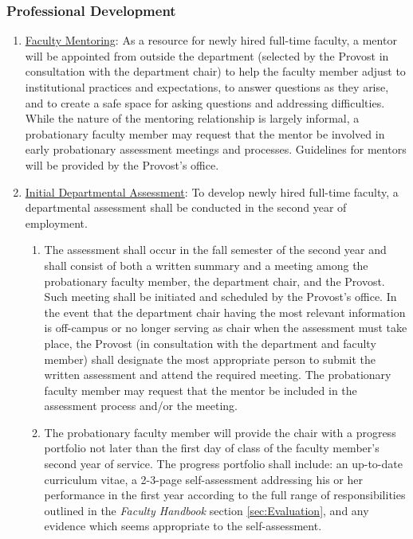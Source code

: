 		\subsubsection{Professional Development}
			\label{sec:ProfessionalDevelopment}
			\begin{enumerate}[label=\alph*)]

				\item{\underline{ Faculty Mentoring}:  As a resource for
					newly hired full-time faculty, a mentor will be
					appointed from outside the department (selected by the
					Provost in consultation with the department chair) to
					help the faculty member adjust to institutional
					practices and expectations, to answer questions as they
					arise, and to create a safe space for asking questions
					and addressing difficulties.  While the nature of the
					mentoring relationship is largely informal, a
					probationary faculty member may request that the mentor
					be involved in early probationary assessment meetings
					and processes.  Guidelines for mentors will be provided
					by the Provost's office. }

				\item{\underline{ Initial Departmental Assessment}:  To develop newly hired
					full-time faculty, a departmental assessment shall be conducted in the second
					year of employment.

					\begin{enumerate}[label=\arabic*)]

						\item{ The assessment shall occur in the fall semester of the
							second year and shall consist of both a written summary and a
							meeting among the probationary faculty member, the department
							chair, and the Provost.  Such meeting shall be initiated and
							scheduled by the Provost's office.  In the event that the
							department chair having the most relevant information is
							off-campus or no longer serving as chair when the assessment
							must take place, the Provost (in consultation with the
							department and faculty member) shall designate the most
							appropriate person to submit the written assessment and attend
							the required meeting.  The probationary faculty member may
							request that the mentor be included in the assessment process
							and/or the meeting. }

						\item{ The probationary faculty member will provide the chair
							with a progress portfolio not later than the first day of class
							of the faculty member's second year of service. The progress
							portfolio shall include:  an up-to-date curriculum vitae, a
							2-3-page self-assessment addressing his or her performance in
							the first year according to the full range of responsibilities
							outlined in the \emph{Faculty Handbook}
							section
							\ref{sec:Evaluation}, and any
							evidence which seems appropriate to the self-assessment. }


\end{enumerate}}
\end{enumerate}
